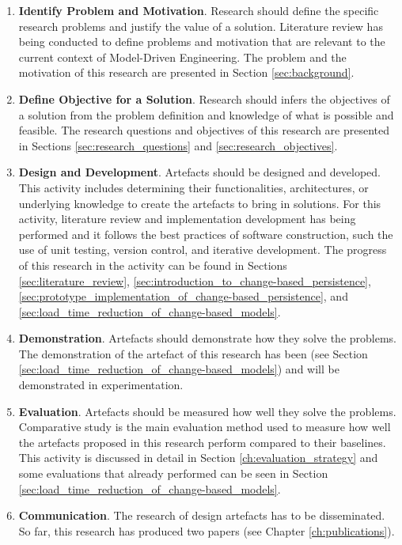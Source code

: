 \documentclass[12pt, a4paper]{report} \usepackage[titletoc]{appendix}
\begin{document}
\begin{enumerate}
	\item \textbf{Identify Problem and Motivation}. Research should define the specific research problems and justify the value of a solution. Literature review has being conducted to define problems and motivation that are relevant to the current context of Model-Driven Engineering. The problem and the motivation of this research are presented in Section \ref{sec:background}.   
	\item \textbf{Define Objective for a Solution}. Research should infers the objectives of a solution from the problem definition and knowledge of what is possible and feasible. The research questions and objectives of this research are presented in Sections \ref{sec:research_questions} and \ref{sec:research_objectives}.
	\item \textbf{Design and Development}. Artefacts should be designed and developed. This activity includes determining their functionalities, architectures, or underlying knowledge to create the artefacts to bring in solutions. For this activity, literature review and implementation development has being performed and it follows the best practices of software construction, such the use of unit testing, version control, and iterative development. The progress of this research in the activity can be found in Sections \ref{sec:literature_review}, \ref{sec:introduction_to_change-based_persistence}, \ref{sec:prototype_implementation_of_change-based_persistence}, and \ref{sec:load_time_reduction_of_change-based_models}. 
	\item \textbf{Demonstration}. Artefacts should demonstrate how they solve the problems. The demonstration of the artefact of this research has been (see Section \ref{sec:load_time_reduction_of_change-based_models}) and will be demonstrated in experimentation. 
	\item \textbf{Evaluation}. Artefacts should be measured how well they solve the problems. Comparative study is the main evaluation method used to measure how well the artefacts proposed in this research perform compared to their baselines. This activity is discussed in detail in Section \ref{ch:evaluation_strategy} and some evaluations that already performed can be seen in Section \ref{sec:load_time_reduction_of_change-based_models}.
	\item \textbf{Communication}. The research of design artefacts has to be disseminated. So far, this research has produced two papers (see Chapter \ref{ch:publications}). 
\end{enumerate}
\end{document}
